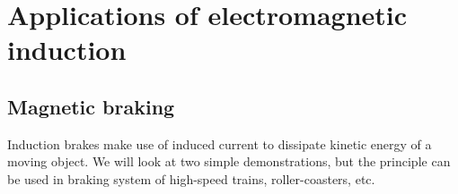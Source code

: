 	
		
		
		




\section{Applications of electromagnetic induction}

\subsection{Magnetic braking}

Induction brakes make use of induced current to dissipate kinetic energy of a moving object. We will look at two simple demonstrations, but the principle can be used in braking system of high-speed trains, roller-coasters, etc.


